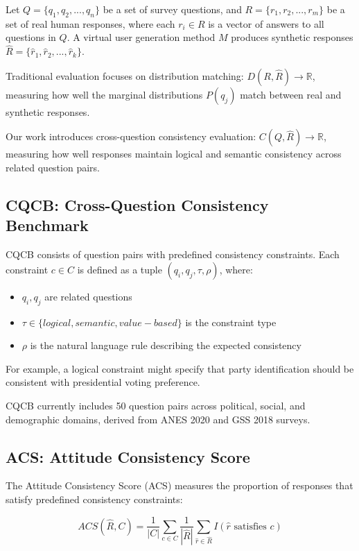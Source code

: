 \documentclass[sigconf, anonymous]{acmart}
\begin{document}
Let $Q = \{q_1, q_2, ..., q_n\}$ be a set of survey questions, and $R = \{r_1, r_2, ..., r_m\}$ be a set of real human responses, where each $r_i \in R$ is a vector of answers to all questions in $Q$. A virtual user generation method $M$ produces synthetic responses $\hat{R} = \{\hat{r}_1, \hat{r}_2, ..., \hat{r}_k\}$.

Traditional evaluation focuses on distribution matching: $D(R, \hat{R}) \rightarrow \mathbb{R}$, measuring how well the marginal distributions $P(q_j)$ match between real and synthetic responses.

Our work introduces cross-question consistency evaluation: $C(Q, \hat{R}) \rightarrow \mathbb{R}$, measuring how well responses maintain logical and semantic consistency across related question pairs.

\subsection{CQCB: Cross-Question Consistency Benchmark}

CQCB consists of question pairs with predefined consistency constraints. Each constraint $c \in C$ is defined as a tuple $(q_i, q_j, \tau, \rho)$, where:

\begin{itemize}
    \item $q_i, q_j$ are related questions
    \item $\tau \in \{logical, semantic, value-based\}$ is the constraint type
    \item $\rho$ is the natural language rule describing the expected consistency
\end{itemize}

For example, a logical constraint might specify that party identification should be consistent with presidential voting preference.

CQCB currently includes 50 question pairs across political, social, and demographic domains, derived from ANES 2020 and GSS 2018 surveys.

\subsection{ACS: Attitude Consistency Score}

The Attitude Consistency Score (ACS) measures the proportion of responses that satisfy predefined consistency constraints:

\[
ACS(\hat{R}, C) = \frac{1}{|C|} \sum_{c \in C} \frac{1}{|\hat{R}|} \sum_{\hat{r} \in \hat{R}} I(\hat{r} \text{ satisfies } c)
\]
\end{document}
